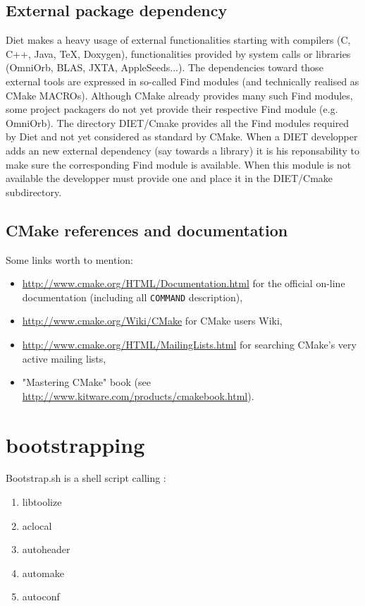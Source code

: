 \subsection{External package dependency}
Diet makes a heavy usage of external functionalities starting with
compilers (C, C++, Java, TeX, Doxygen), functionalities provided by system
calls or libraries (OmniOrb, BLAS, JXTA, AppleSeeds...).
The dependencies toward those external tools are expressed in so-called
Find modules (and technically realised as CMake MACROs).
Although CMake already provides many such Find modules, some project 
packagers do not yet provide their respective Find module (e.g. OmniOrb).
The directory DIET/Cmake provides all the Find modules required by Diet
and not yet considered as standard by CMake.
When a DIET developper adds an new external dependency (say towards a
library) it is his reponsability to make sure the corresponding 
Find module is available. When this module is not available the
developper must provide one and place it in the DIET/Cmake subdirectory.

\subsection{CMake references and documentation}
Some links worth to mention:
\begin{itemize}
\item \url{http://www.cmake.org/HTML/Documentation.html} for the official
      on-line documentation (including all \texttt{COMMAND} description),
\item \url{http://www.cmake.org/Wiki/CMake} for CMake users Wiki,
\item \url{http://www.cmake.org/HTML/MailingLists.html} for searching
      CMake's very active mailing lists,
\item "Mastering CMake" book (see
      \url{http://www.kitware.com/products/cmakebook.html}).
\end{itemize}

\section{bootstrapping}
Bootstrap.sh is a shell script calling :
\begin{enumerate}
\item{libtoolize}
\item{aclocal}
\item{autoheader}
\item{automake}
\item{autoconf}
\end{enumerate}

